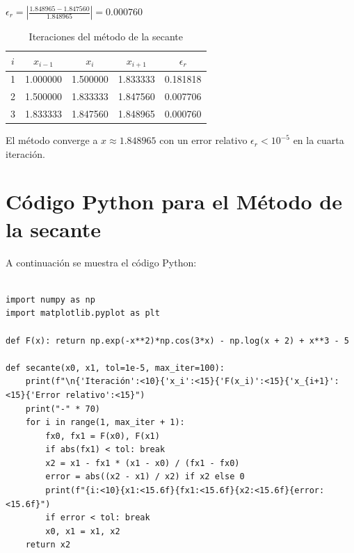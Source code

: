\documentclass[12pt]{article}
\begin{document}
\begin{center}
$\epsilon_r=\left|\frac{1.848965-1.847560}{1.848965}\right|=0.000760$

\vspace{0.5cm}
\begin{table}[h]
	\centering
	\caption{Iteraciones del método de la secante}
	\begin{tabular}{ccccc}
		\toprule
		$i$ & $x_{i-1}$ & $x_i$ & $x_{i+1}$ & $\epsilon_r$ \\
		\midrule
		1 & 1.000000 & 1.500000 & 1.833333 & 0.181818 \\
		2 & 1.500000 & 1.833333 & 1.847560 & 0.007706 \\
		3 & 1.833333 & 1.847560 & 1.848965 & 0.000760 \\
		\bottomrule
	\end{tabular}
\end{table}

\vspace{0.5cm}

El método converge a $x \approx 1.848965$ con un error relativo $\epsilon_r < 10^{-5}$ en la cuarta iteración.

\vspace{1cm}

\section*{Código Python para el Método de la secante}

A continuación se muestra el código Python:


\begin{tcolorbox}[title=Método de la secante,
                  colback=white,
                  colframe=black,
                  breakable, enhanced]
\begin{lstlisting}[style=mypython]

import numpy as np
import matplotlib.pyplot as plt
	
def F(x): return np.exp(-x**2)*np.cos(3*x) - np.log(x + 2) + x**3 - 5
	
def secante(x0, x1, tol=1e-5, max_iter=100):
	print(f"\n{'Iteración':<10}{'x_i':<15}{'F(x_i)':<15}{'x_{i+1}':<15}{'Error relativo':<15}")
	print("-" * 70)
	for i in range(1, max_iter + 1):
	    fx0, fx1 = F(x0), F(x1)
	    if abs(fx1) < tol: break
	    x2 = x1 - fx1 * (x1 - x0) / (fx1 - fx0)
	    error = abs((x2 - x1) / x2) if x2 else 0
	    print(f"{i:<10}{x1:<15.6f}{fx1:<15.6f}{x2:<15.6f}{error:<15.6f}")
	    if error < tol: break
	    x0, x1 = x1, x2
	return x2
	

\end{lstlisting}
\end{tcolorbox}
\end{center}
\end{document}
